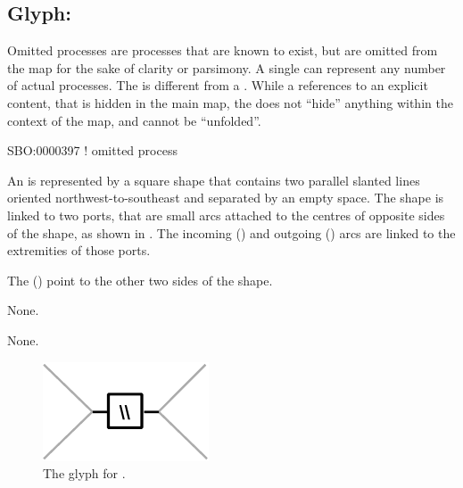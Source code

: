 \subsection{Glyph: }
\label{sec:omitted}

Omitted processes are processes that are known to exist, but are omitted from the map for the sake of clarity or parsimony. A single  can represent any number of actual processes. The  is different from a . While a  references to an explicit content, that is hidden in the main map, the  does not ``hide'' anything within the context of the map, and cannot be ``unfolded''.

\begin{glyphDescription}

\glyphSboTerm
SBO:0000397 ! omitted process



\glyphContainer
An  is represented by a square shape that contains two parallel slanted lines oriented northwest-to-southeast and separated by an empty space.
The shape is linked to two ports, that are small arcs attached to the centres of opposite sides of the shape, as shown in .
The incoming  () and outgoing  () arcs are linked to the extremities of those ports.

The  () point to the other two sides of the shape.

\glyphLabel
None.

\glyphAux
None.

\end{glyphDescription}

\begin{figure}[H]
  \centering
  \includegraphics{images/omitted}
  \caption{The \PD glyph for .}
  \label{fig:omitted}
\end{figure}
